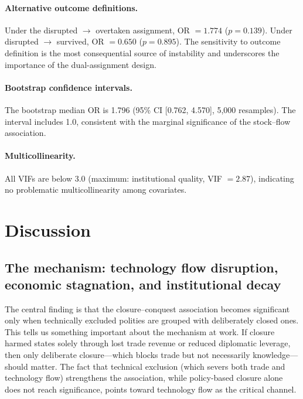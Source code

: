\documentclass[pdflatex,sn-basic]{sn-jnl}
\theoremstyle{thmstyleone}%
\theoremstyle{thmstyletwo}%
\theoremstyle{thmstylethree}%
\begin{document}
\paragraph{Alternative outcome definitions.}
Under the disrupted $\to$ overtaken assignment, OR $= 1.774$ ($p = 0.139$). Under disrupted $\to$ survived, OR $= 0.650$ ($p = 0.895$). The sensitivity to outcome definition is the most consequential source of instability and underscores the importance of the dual-assignment design.

\paragraph{Bootstrap confidence intervals.}
The bootstrap median OR is 1.796 (95\% CI [0.762, 4.570], 5{,}000 resamples). The interval includes 1.0, consistent with the marginal significance of the stock--flow association.

\paragraph{Multicollinearity.}
All VIFs are below 3.0 (maximum: institutional quality, VIF $= 2.87$), indicating no problematic multicollinearity among covariates.

\section{Discussion}\label{sec:discussion}

\subsection{The mechanism: technology flow disruption, economic stagnation, and institutional decay}\label{sec:disc-mechanism}

The central finding is that the closure--conquest association becomes significant only when technically excluded polities are grouped with deliberately closed ones. This tells us something important about the mechanism at work. If closure harmed states solely through lost trade revenue or reduced diplomatic leverage, then only deliberate closure---which blocks trade but not necessarily knowledge---should matter. The fact that technical exclusion (which severs both trade and technology flow) strengthens the association, while policy-based closure alone does not reach significance, points toward technology flow as the critical channel.
\end{document}
